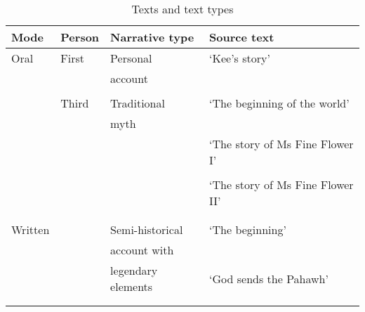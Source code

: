 \documentclass[output=paper]{LSP/langsci}
\begin{document}
\begin{table}[]
\small
\caption{Texts and text types}
\label{Jatable1}
\begin{tabular}{llll}
  \lsptoprule
Mode & Person                  & Narrative type                     & Source text                         \\
\midrule
 Oral & First  					& Personal  						& `Kee's story'       \\
   &                     &    account                            & \citep[][Appendix B]{fuller85}                                   \\
          &                                    &        &                           \\                    
           & Third 					& Traditional 						& `The beginning of the world'                            \\
            &            &  myth                                   & \citep[][Chapter 1]{johnson92}                                        \\
             &           &                                    & `The story of Ms Fine Flower I'                                   \\
            &            &                                    & \citep[][Chapter 5]{johnson92}                                  \\
           &             &                                   & `The story of Ms Fine Flower II'                                   \\
           &             &                                    & \citep[][Chapter 6]{johnson92}                                       \\
                           &                                    &        &                           \\                                           
 Written  &                     &  Semi-historical                                  & `The beginning'         \\
            &            &  account with                                  & \citep[][Chapter 1]{vang90}                                      \\
            &            &  legendary elements                                  & `God sends the Pahawh'                                      \\
            &            &                                    & \citep[][Chapter 2]{vang90}                                    \\
 \lspbottomrule
\end{tabular}
\end{table}
\end{document}
